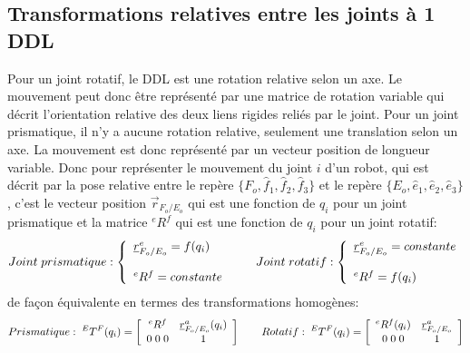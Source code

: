 \subsection{Transformations relatives entre les joints à 1 DDL}
%
Pour un joint rotatif, le DDL est une rotation relative selon un axe. Le mouvement peut donc être représenté par une matrice de rotation variable qui décrit l'orientation relative des deux liens rigides reliés par le joint. Pour un joint prismatique, il n'y a aucune rotation relative, seulement une translation selon un axe. La mouvement est donc représenté par un vecteur position de longueur variable. Donc pour représenter le mouvement du joint $i$ d'un robot, qui est décrit par la pose relative entre le repère $\{F_o, \hat{f}_1, \hat{f}_2, \hat{f}_3\}$ et le repère $\{E_o, \hat{e}_1, \hat{e}_2, \hat{e}_3\}$, c'est le vecteur position $\vec{r}_{F_o/E_o}$ qui est une fonction de $q_i$ pour un joint prismatique et la matrice $^{e}R^f$ qui est une fonction de $q_i$ pour un joint rotatif:
\begin{align}
Joint\;prismatique: 
\left\{ 
\begin{array}{l}
\underline{r}_{F_o/E_o}^e = f( q_i ) 
\\ \\
^{e}R^f = constante
\end{array} \right.
\quad\quad 
Joint\;rotatif: 
\left\{ 
\begin{array}{l}
\underline{r}_{F_o/E_o}^e = constante
\\ \\
^{e}R^f = f( q_i )
\end{array} \right.
\end{align} 
de façon équivalente en termes des transformations homogènes:
\begin{align}
Prismatique: \;
^{E}T^F( q_i ) = \left[ \begin{array}{c c}
	^{e}R^f  & \underline{r}_{F_o/E_o}^a( q_i )  \\ 0 \; 0 \; 0 & 1
\end{array}  \right]
\quad\quad 
Rotatif: \;
^{E}T^F( q_i ) = \left[ \begin{array}{c c}
	^{e}R^f( q_i )  & \underline{r}_{F_o/E_o}^a  \\ 0 \; 0 \; 0 & 1
\end{array}  \right]
\end{align} 



